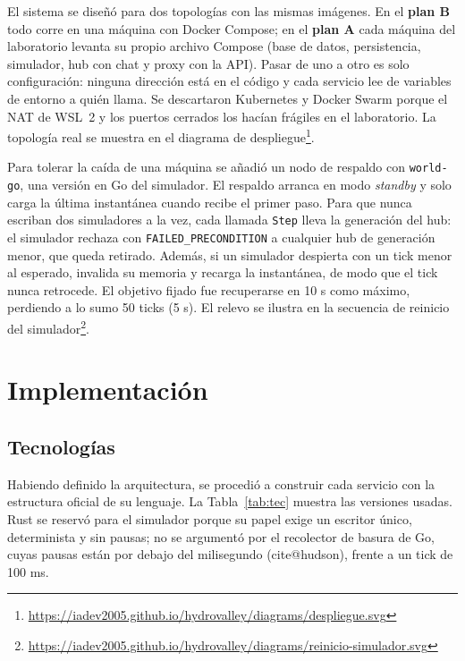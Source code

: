 \documentclass[11pt,letterpaper]{article}
\makeatletter
\newcommand{\parencite}[1]{(\csname cite@#1\endcsname)}
\newcommand{\site}{https://iadev2005.github.io/hydrovalley}
\newcommand{\diag}[2]{#2\footnote{\url{\site/diagrams/#1}}}
\makeatother
\begin{document}
El sistema se diseñó para dos topologías con las mismas imágenes. En el \textbf{plan B} todo corre en una máquina con Docker Compose; en el \textbf{plan A} cada máquina del laboratorio levanta su propio archivo Compose (base de datos, persistencia, simulador, hub con chat y proxy con la API). Pasar de uno a otro es solo configuración: ninguna dirección está en el código y cada servicio lee de variables de entorno a quién llama. Se descartaron Kubernetes y Docker Swarm porque el NAT de WSL~2 y los puertos cerrados los hacían frágiles en el laboratorio. La topología real se muestra en el \diag{despliegue.svg}{diagrama de despliegue}.

Para tolerar la caída de una máquina se añadió un nodo de respaldo con \texttt{world-go}, una versión en Go del simulador. El respaldo arranca en modo \textit{standby} y solo carga la última instantánea cuando recibe el primer paso. Para que nunca escriban dos simuladores a la vez, cada llamada \texttt{Step} lleva la generación del hub: el simulador rechaza con \texttt{FAILED\_PRECONDITION} a cualquier hub de generación menor, que queda retirado. Además, si un simulador despierta con un tick menor al esperado, invalida su memoria y recarga la instantánea, de modo que el tick nunca retrocede. El objetivo fijado fue recuperarse en 10 s como máximo, perdiendo a lo sumo 50 ticks (5 s). El relevo se ilustra en la \diag{reinicio-simulador.svg}{secuencia de reinicio del simulador}.

\section{Implementación}

\subsection{Tecnologías}

Habiendo definido la arquitectura, se procedió a construir cada servicio con la estructura oficial de su lenguaje. La Tabla~\ref{tab:tec} muestra las versiones usadas. Rust se reservó para el simulador porque su papel exige un escritor único, determinista y sin pausas; no se argumentó por el recolector de basura de Go, cuyas pausas están por debajo del milisegundo \parencite{hudson}, frente a un tick de 100 ms.
\end{document}
